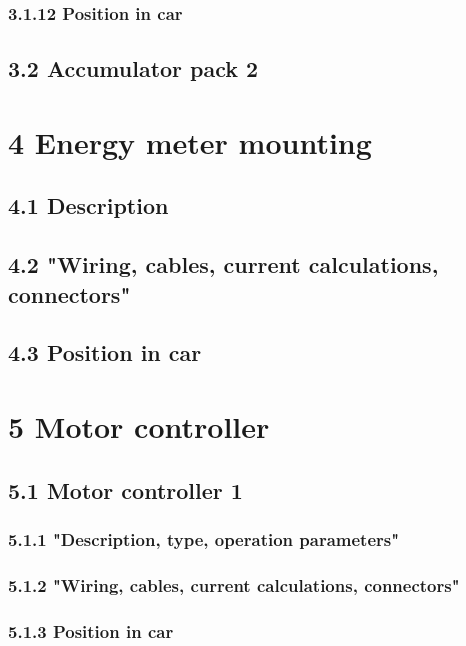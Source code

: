 \documentclass{article}
\begin{document}
\subsubsection*{3.1.12 Position in car}

\subsection*{3.2 Accumulator pack 2}

\section*{4 Energy meter mounting}

\subsection*{4.1 Description}

\subsection*{4.2 "Wiring, cables, current calculations, connectors"}

\subsection*{4.3 Position in car}

\section*{5 Motor controller}

\subsection*{5.1 Motor controller 1}

\subsubsection*{5.1.1 "Description, type, operation parameters"}

\subsubsection*{5.1.2 "Wiring, cables, current calculations, connectors"}

\subsubsection*{5.1.3 Position in car}
\end{document}
